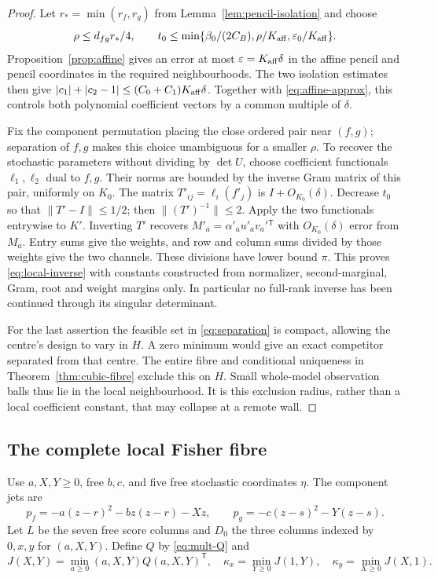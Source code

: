 \begin{proof}
Let $r_* =\min(r_f,r_g)$ from Lemma~\ref{lem:pencil-isolation} and choose
\[
 \rho\le d_{fg}r_*/4,\qquad
 t_0\le\min\{\beta_0/(2C_B),\rho/K_{\rm aff},
                       \varepsilon_0/K_{\rm aff}\}.
\]
Proposition~\ref{prop:affine} gives an error at most
$\varepsilon=K_{\rm aff}\delta$ in the affine pencil and pencil
coordinates in the required neighbourhoods. The two isolation estimates
then give $|c_1|+|c_2-1|\le(C_0+C_1)K_{\rm aff}\delta$.
Together with \eqref{eq:affine-approx}, this controls both polynomial
coefficient vectors by a common multiple of $\delta$.

Fix the component permutation placing the close ordered pair near
$(f,g)$; separation of $f,g$ makes this choice unambiguous for a smaller
$\rho$. To recover the stochastic parameters without dividing by $\det U$,
choose coefficient functionals $\ell_1,\ell_2$ dual to $f,g$. Their
norms are bounded by the inverse Gram matrix of this pair, uniformly
on $K_0$. The matrix $T'_{ij}=\ell_i(f'_j)$ is $I+O_{K_0}(\delta)$.
Decrease $t_0$ so that $\|T'-I\|\le1/2$; then $\|(T')^{-1}\|\le2$.
Apply the two functionals entrywise to $K'$. Inverting $T'$ recovers
$M'_a=\alpha'_au'_av_a'{}^{\mathsf T}$ with $O_{K_0}(\delta)$ error
from $M_a$. Entry sums give the weights, and row and column sums divided
by those weights give the two channels. These divisions have lower
bound $\pi$. This proves \eqref{eq:local-inverse} with constants
constructed from normalizer, second-marginal, Gram, root and weight
margins only. In particular no full-rank inverse has been continued
through its singular determinant.

For the last assertion the feasible set in \eqref{eq:separation} is
compact, allowing the centre's design to vary in $H$. A zero minimum
would give an exact competitor separated from that centre. The entire
fibre and conditional uniqueness in Theorem~\ref{thm:cubic-fibre}
exclude this on $H$. Small whole-model observation balls thus lie in
the local neighbourhood. It is this exclusion radius, rather than a
local coefficient constant, that may collapse at a remote wall.
\end{proof}

\subsection{The complete local Fisher fibre}
Use $a,X,Y\ge0$, free $b,c$, and five free stochastic coordinates $\eta$.
The component jets are
\begin{equation}\label{eq:cubic-jets}
 p_f=-a(z-r)^2-bz(z-r)-Xz,\qquad
 p_g=-c(z-s)^2-Y(z-s).
\end{equation}
Let $L$ be the seven free score columns and $D_0$ the three columns
indexed by $0,x,y$ for $(a,X,Y)$. Define $Q$ by \eqref{eq:mult-Q} and
\begin{equation}\label{eq:cubic-kappa}
 J(X,Y)=\min_{a\ge0}(a,X,Y)Q(a,X,Y)^{\mathsf T},\quad
 \kappa_x=\min_{Y\ge0}J(1,Y),\quad
 \kappa_y=\min_{X\ge0}J(X,1).
\end{equation}

